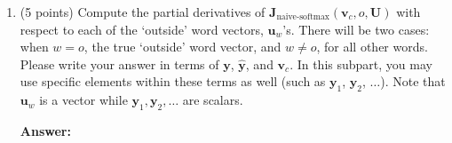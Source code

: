 \documentclass{article}
\newenvironment{answer}{
    {\bf Answer:} \sf \begingroup\color{red}
}{\endgroup}%
\begin{document}
\begin{enumerate}[label=(\alph*)]
\begin{shaded}
\begin{answer}

\begin{equation*}
    \bm{J}
    = - \log \frac{\exp(\bm u_{o}^\top \bm v_c)}{\sum_{w \in \text{Vocab}} \exp(\bm u_{w}^\top \bm v_c)}
    = \log \sum_{w \in \text{Vocab}} \exp(\bm u_{w}^\top \bm v_c) - {\bm u_{o}^\top \bm v_c}
\end{equation*}

Thus, the partial derivative $\frac{\partial \bm J}{\partial \bm v_c}$ is
\begin{align*}
    \frac{\partial \bm J}{\partial \bm v_c}
    &= \sum_{w \in \text{Vocab}} \frac{\exp(\bm u_{w}^\top \bm v_c) \bm{u}_{w}^\top}{\sum_{w \in \text{Vocab}} \exp(\bm u_{w}^\top \bm v_c)} - \bm{u}_o \\
    &= \sum_{w \in \text{Vocab}} P(O=w|C=c) \bm{u}_w - \bm{u}_o \\
    &= \sum_{w \in \text{Vocab}} \hat{\bm y}_w \bm{u}_w - \bm{u}_o \\
    &= U(\hat{\bm y} - \bm{y})
\end{align*}

\begin{enumerate}[label=(\arabic*)]
    \item The gradient is zero when $\hat{\bm y} = \bm{y}$.
    \item It is because $\bm y$ is a conditional probability of $\bm u_o$ over $\bm v_c$.
\end{enumerate}

\end{answer}
\end{shaded}

\item (5 points) Compute the partial derivatives of $\bm J_{\text{naive-softmax}}(\bm v_c, o, \bm U)$ with respect to each of the `outside' word vectors, $\bm u_w$'s. There will be two cases: when $w=o$, the true `outside' word vector, and $w \neq o$, for all other words. Please write your answer in terms of $\bm y$, $\hat{\bm y}$, and $\bm v_c$. In this subpart, you may use specific elements within these terms as well (such as $\bm y_1$, $\bm y_2$, $\dots$). Note that $\bm u_w$ is a vector while $\bm y_1, \bm y_2, \dots$ are scalars.

\begin{shaded}
\begin{answer}


\end{answer}
\end{shaded}
\end{enumerate}
\end{document}
